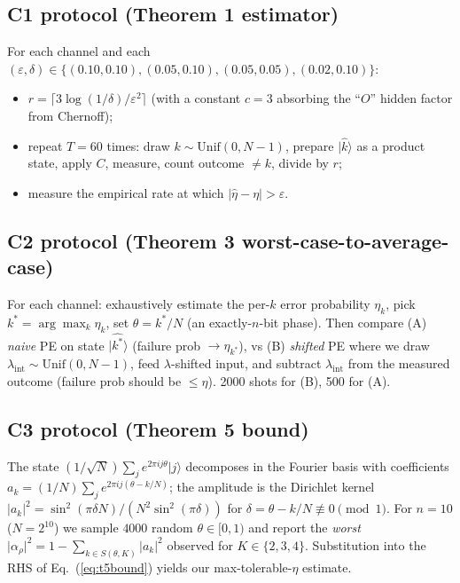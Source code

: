 \documentclass[11pt]{article}
\newcommand{\ket}[1]{\lvert #1 \rangle}
\newcommand{\eq}[1]{Eq.~(\ref{eq:#1})}
\begin{document}
\subsection{C1 protocol (Theorem 1 estimator)}
For each channel and each $(\varepsilon, \delta) \in
\{(0.10,0.10), (0.05,0.10), (0.05,0.05), (0.02,0.10)\}$:
\begin{itemize}
\item $r = \lceil 3\log(1/\delta)/\varepsilon^2 \rceil$ (with a constant
      $c=3$ absorbing the ``$O$'' hidden factor from Chernoff);
\item repeat $T = 60$ times:
      draw $k \sim \mathrm{Unif}(0, N-1)$, prepare $\ket{\hat k}$ as a
      product state, apply $C$, measure, count outcome $\neq k$, divide
      by $r$;
\item measure the empirical rate at which $\lvert \hat\eta - \eta \rvert > \varepsilon$.
\end{itemize}

\subsection{C2 protocol (Theorem 3 worst-case-to-average-case)}
For each channel: exhaustively estimate the per-$k$ error probability
$\eta_k$, pick $k^* = \arg\max_k \eta_k$, set $\theta = k^*/N$ (an
exactly-$n$-bit phase).  Then compare
(A) \emph{naive} PE on state $\ket{\hat{k^*}}$ (failure prob $\to \eta_{k^*}$),
vs
(B) \emph{shifted} PE where we draw
$\lambda_{\text{int}} \sim \mathrm{Unif}(0,N-1)$, feed
$\lambda$-shifted input, and subtract $\lambda_{\text{int}}$ from the
measured outcome (failure prob should be $\leq \eta$).  2000 shots for
(B), 500 for (A).

\subsection{C3 protocol (Theorem 5 bound)}
The state $(1/\sqrt N)\sum_j e^{2\pi ij\theta}\ket j$ decomposes in the
Fourier basis with coefficients $a_k = (1/N)\sum_j e^{2\pi ij(\theta - k/N)}$;
the amplitude is the Dirichlet kernel $\lvert a_k\rvert^2 = \sin^2(\pi\delta N)/(N^2 \sin^2(\pi\delta))$
for $\delta = \theta - k/N \not\equiv 0 \pmod 1$.  For $n=10$ ($N=2^{10}$)
we sample $4000$ random $\theta \in [0,1)$ and report the \emph{worst}
$\lvert\alpha_\rho\rvert^2 = 1 - \sum_{k\in S(\theta,K)} \lvert a_k\rvert^2$
observed for $K\in\{2,3,4\}$.  Substitution into the RHS of \eq{t5bound}
yields our max-tolerable-$\eta$ estimate.
\end{document}
